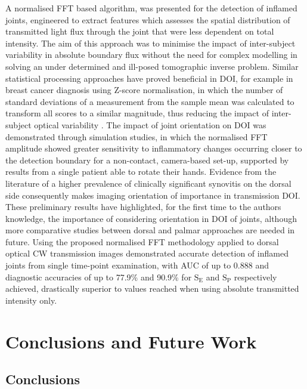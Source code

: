 \documentclass[twoside]{bhamthesis}
\theoremstyle{definition}
\begin{document}
A normalised FFT based algorithm, was presented for the detection of inflamed joints, engineered to extract features which assesses the spatial distribution of transmitted light flux through the joint that were less dependent on total intensity. The aim of this approach was to minimise the impact of inter-subject variability in absolute boundary flux without the need for complex modelling in solving an under determined and ill-posed tomographic inverse problem. Similar statistical processing approaches have proved beneficial in DOI, for example in breast cancer diagnosis using Z-score normalisation, in which the number of standard deviations of a measurement from the sample mean was calculated to transform all scores to a similar magnitude, thus reducing the impact of inter-subject optical variability \cite{cochran2018tissue}. The impact of joint orientation on DOI was demonstrated through simulation studies, in which the normalised FFT amplitude showed greater sensitivity to inflammatory changes occurring closer to the detection boundary for a non-contact, camera-based set-up, supported by results from a single patient able to rotate their hands. Evidence from the literature of a higher prevalence of clinically significant synovitis on the dorsal side consequently makes imaging orientation of importance in transmission DOI. These preliminary results have highlighted, for the first time to the authors knowledge, the importance of considering orientation in DOI of joints, although more comparative studies between dorsal and palmar approaches are needed in future. Using the proposed normalised FFT methodology applied to dorsal optical CW transmission images demonstrated accurate detection of inflamed joints from single time-point examination, with AUC of up to 0.888 and diagnostic accuracies of up to 77.9\% and 90.9\% for $\mathrm{S_E}$ and $\mathrm{S_P}$ respectively achieved, drastically superior to values reached when using absolute transmitted intensity only.

\chapter{Conclusions and Future Work}
\label{Conclusions and Future Work}

\section{Conclusions}
\end{document}
